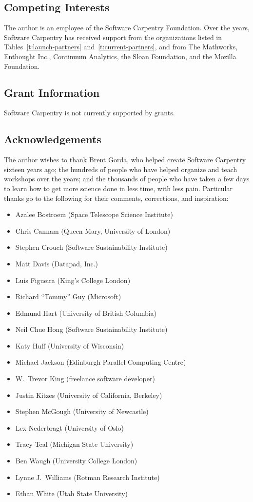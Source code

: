 \documentclass[10pt,a4paper,twocolumn]{article}
\begin{document}
\subsection*{Competing Interests}

The author is an employee of the Software Carpentry Foundation. Over
the years, Software Carpentry has received support from the
organizations listed in Tables~\ref{t:launch-partners}
and~\ref{t:current-partners}, and from The Mathworks, Enthought Inc.,
Continuum Analytics, the Sloan Foundation, and the Mozilla Foundation.

\subsection*{Grant Information}

Software Carpentry is not currently supported by grants.

\subsection*{Acknowledgements}

The author wishes to thank Brent Gorda, who helped create Software
Carpentry sixteen years ago; the hundreds of people who have helped
organize and teach workshops over the years; and the thousands of
people who have taken a few days to learn how to get more science
done in less time, with less pain.  Particular thanks go to the
following for their comments, corrections, and inspiration:

\begin{itemize}
\item
  Azalee Bostroem (Space Telescope Science Institute)
\item
  Chris Cannam (Queen Mary, University of London)
\item
  Stephen Crouch (Software Sustainability Institute)
\item
  Matt Davis (Datapad, Inc.)
\item
  Luis Figueira (King's College London)
\item
  Richard ``Tommy'' Guy (Microsoft)
\item
  Edmund Hart (University of British Columbia)
\item
  Neil Chue Hong (Software Sustainability Institute)
\item
  Katy Huff (University of Wisconsin)
\item
  Michael Jackson (Edinburgh Parallel Computing Centre)
\item
  W.\ Trevor King (freelance software developer)
\item
  Justin Kitzes (University of California, Berkeley)
\item
  Stephen McGough (University of Newcastle)
\item
  Lex Nederbragt (University of Oslo)
\item
  Tracy Teal (Michigan State University)
\item
  Ben Waugh (University College London)
\item
  Lynne J.\ Williams (Rotman Research Institute)
\item
  Ethan White (Utah State University)
\end{itemize}
\end{document}
